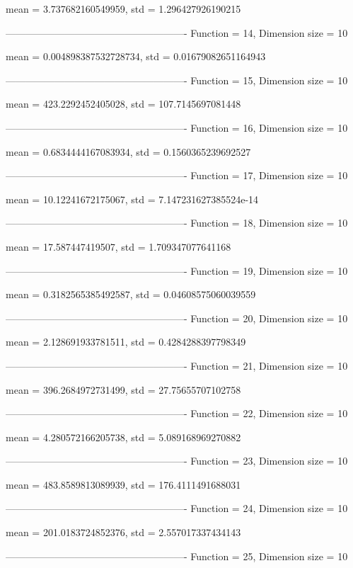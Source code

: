 mean = 3.737682160549959, std = 1.296427926190215

-------------------------------------------------------
Function = 14, Dimension size = 10


mean = 0.004898387532728734, std = 0.01679082651164943

-------------------------------------------------------
Function = 15, Dimension size = 10


mean = 423.2292452405028, std = 107.7145697081448

-------------------------------------------------------
Function = 16, Dimension size = 10


mean = 0.6834444167083934, std = 0.1560365239692527

-------------------------------------------------------
Function = 17, Dimension size = 10


mean = 10.12241672175067, std = 7.147231627385524e-14

-------------------------------------------------------
Function = 18, Dimension size = 10


mean = 17.587447419507, std = 1.709347077641168

-------------------------------------------------------
Function = 19, Dimension size = 10


mean = 0.3182565385492587, std = 0.04608575060039559

-------------------------------------------------------
Function = 20, Dimension size = 10


mean = 2.128691933781511, std = 0.4284288397798349

-------------------------------------------------------
Function = 21, Dimension size = 10


mean = 396.2684972731499, std = 27.75655707102758

-------------------------------------------------------
Function = 22, Dimension size = 10


mean = 4.280572166205738, std = 5.089168969270882

-------------------------------------------------------
Function = 23, Dimension size = 10


mean = 483.8589813089939, std = 176.4111491688031

-------------------------------------------------------
Function = 24, Dimension size = 10


mean = 201.0183724852376, std = 2.557017337434143

-------------------------------------------------------
Function = 25, Dimension size = 10


